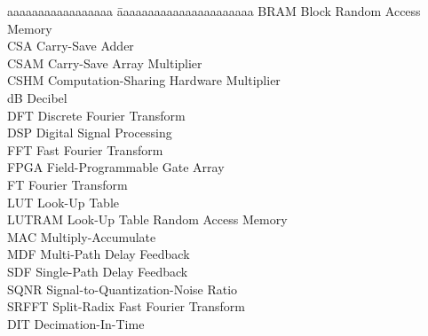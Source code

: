 
\newcommand{\abbrev}[2]{#1 \> #2\\ }
\begin{abbreviations}

\begin{tabbing}
  aaaaaaaaaaaaaaaaa \= aaaaaaaaaaaaaaaaaaaaaa\kill
  \abbrev{BRAM}{Block Random Access Memory}
  \abbrev{CSA}{Carry-Save Adder}
  \abbrev{CSAM}{Carry-Save Array Multiplier}
  \abbrev{CSHM}{Computation-Sharing Hardware Multiplier}
  \abbrev{dB}{Decibel}
  \abbrev{DFT}{Discrete Fourier Transform}
  \abbrev{DSP}{Digital Signal Processing}
  \abbrev{FFT}{Fast Fourier Transform}
  \abbrev{FPGA}{Field-Programmable Gate Array}
  \abbrev{FT}{Fourier Transform}
  \abbrev{LUT}{Look-Up Table}
  \abbrev{LUTRAM}{Look-Up Table Random Access Memory}
  \abbrev{MAC}{Multiply-Accumulate}
  \abbrev{MDF}{Multi-Path Delay Feedback}
  \abbrev{SDF}{Single-Path Delay Feedback}
  \abbrev{SQNR}{Signal-to-Quantization-Noise Ratio}
  \abbrev{SRFFT}{Split-Radix Fast Fourier Transform}
  \abbrev{DIT}{Decimation-In-Time}
\end{tabbing}
\end{abbreviations}